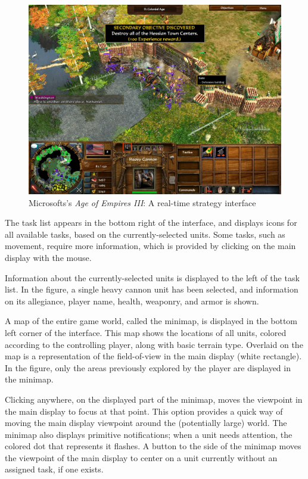 \begin{figure}[ht]
\begin{center}
\includegraphics[width=5in]{images/age_of_empires_3.jpg}
\caption{Microsofts's \emph{Age of Empires III}: A real-time strategy interface \label{fig:aoe3}}
\end{center}
\end{figure}


The task list appears in the bottom right of the interface, and displays icons for all available tasks, based on the currently-selected units. Some tasks, such as movement, require more information, which is provided by clicking on the main display with the mouse.

Information about the currently-selected units is displayed to the left of the task list. In the figure, a single heavy cannon unit has been selected, and information on its allegiance, player name, health, weaponry, and armor is shown.

A map of the entire game world, called the minimap, is displayed in the bottom left corner of the interface. This map shows the locations of all units, colored according to the controlling player, along with basic terrain type. Overlaid on the map is a representation of the field-of-view in the main display (white rectangle). In the figure, only the areas previously explored by the player are displayed in the minimap. %

Clicking anywhere, on the displayed part of the minimap, moves the viewpoint in the main display to focus at that point. This option provides a quick way of moving the main display viewpoint around the (potentially large) world. The minimap also displays primitive notifications; when a unit needs attention, the colored dot that represents it flashes. A button to the side of the minimap moves the viewpoint of the main display to center on a unit currently without an assigned task, if one exists.

